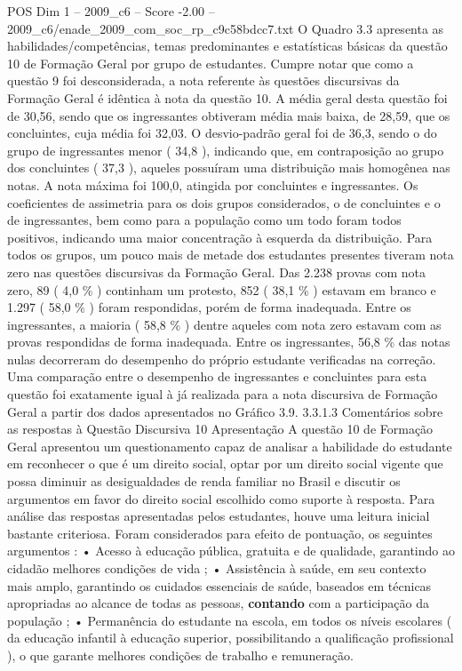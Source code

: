 \begin{textsample}{POS Dim 1 – 2009\_c6 – Score -2.00 – 2009\_c6/enade\_2009\_com\_soc\_rp\_c9c58bdcc7.txt}
O Quadro 3.3 apresenta as habilidades/competências, temas predominantes e estatísticas básicas da questão 10 de Formação Geral por grupo de estudantes.
Cumpre notar que como a questão 9 foi desconsiderada, a nota referente às questões discursivas da Formação Geral é idêntica à nota da questão 10.
A média geral desta questão foi de 30,56, sendo que os ingressantes obtiveram média mais baixa, de 28,59, que os concluintes, cuja média foi 32,03.
O desvio-padrão geral foi de 36,3, sendo o do grupo de ingressantes menor ( 34,8 ), indicando que, em contraposição ao grupo dos concluintes ( 37,3 ), aqueles possuíram uma distribuição mais homogênea nas notas.
A nota máxima foi 100,0, atingida por concluintes e ingressantes.
Os coeficientes de assimetria para os dois grupos considerados, o de concluintes e o de ingressantes, bem como para a população como um todo foram todos positivos, indicando uma maior concentração à esquerda da distribuição.
Para todos os grupos, um pouco mais de metade dos estudantes presentes tiveram nota zero nas questões discursivas da Formação Geral.
Das 2.238 provas com nota zero, 89 ( 4,0 \% ) continham um protesto, 852 ( 38,1 \% ) estavam em branco e 1.297 ( 58,0 \% ) foram respondidas, porém de forma inadequada.
Entre os ingressantes, a maioria ( 58,8 \% ) dentre aqueles com nota zero estavam com as provas respondidas de forma inadequada.
Entre os ingressantes, 56,8 \% das notas nulas decorreram do desempenho do próprio estudante verificadas na correção.
Uma comparação entre o desempenho de ingressantes e concluintes para esta questão foi exatamente igual à já realizada para a nota discursiva de Formação Geral a partir dos dados apresentados no Gráfico 3.9. 3.3.1.3 Comentários sobre as respostas à Questão Discursiva 10 Apresentação A questão 10 de Formação Geral apresentou um questionamento capaz de analisar a habilidade do estudante em reconhecer o que é um direito social, optar por um direito social vigente que possa diminuir as desigualdades de renda familiar no Brasil e discutir os argumentos em favor do direito social escolhido como suporte à resposta.
Para análise das respostas apresentadas pelos estudantes, houve uma leitura inicial bastante criteriosa.
Foram considerados para efeito de pontuação, os seguintes argumentos : • Acesso à educação pública, gratuita e de qualidade, garantindo ao cidadão melhores condições de vida ; • Assistência à saúde, em seu contexto mais amplo, garantindo os cuidados essenciais de saúde, baseados em técnicas apropriadas ao alcance de todas as pessoas, \textbf{contando} com a participação da população ; • Permanência do estudante na escola, em todos os níveis escolares ( da educação infantil à educação superior, possibilitando a qualificação profissional ), o que garante melhores condições de trabalho e remuneração.

\end{textsample}
